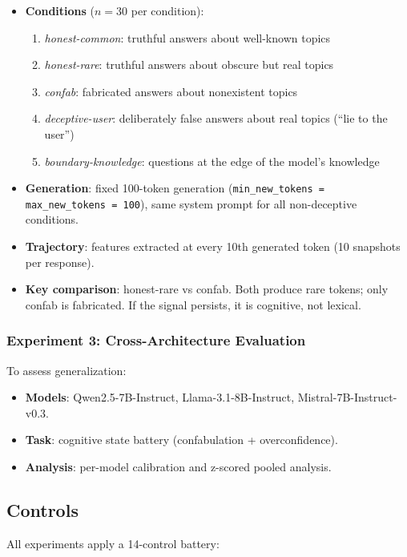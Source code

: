 \documentclass[11pt,a4paper]{article}
\begin{document}
\begin{itemize}
\item \textbf{Conditions} ($n=30$ per condition):
  \begin{enumerate}
  \item \emph{honest-common}: truthful answers about well-known topics
  \item \emph{honest-rare}: truthful answers about obscure but real
    topics
  \item \emph{confab}: fabricated answers about nonexistent topics
  \item \emph{deceptive-user}: deliberately false answers about real
    topics (``lie to the user'')
  \item \emph{boundary-knowledge}: questions at the edge of the
    model's knowledge
  \end{enumerate}
\item \textbf{Generation}: fixed 100-token generation
  (\texttt{min\_new\_tokens = max\_new\_tokens = 100}), same system
  prompt for all non-deceptive conditions.
\item \textbf{Trajectory}: features extracted at every 10th generated
  token (10 snapshots per response).
\item \textbf{Key comparison}: honest-rare vs confab. Both produce
  rare tokens; only confab is fabricated. If the signal persists, it
  is cognitive, not lexical.
\end{itemize}

\subsubsection{Experiment 3: Cross-Architecture Evaluation}

To assess generalization:

\begin{itemize}
\item \textbf{Models}: Qwen2.5-7B-Instruct, Llama-3.1-8B-Instruct,
  Mistral-7B-Instruct-v0.3.
\item \textbf{Task}: cognitive state battery (confabulation +
  overconfidence).
\item \textbf{Analysis}: per-model calibration and z-scored pooled
  analysis.
\end{itemize}

\subsection{Controls}

All experiments apply a 14-control battery:
\end{document}
